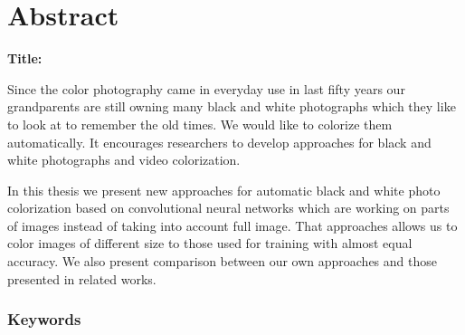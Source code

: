 \chapter*{Abstract}

\noindent\textbf{Title:} \ttitleEn
\bigskip

Since the color photography came in everyday use in last fifty years our grandparents are still owning many black and white photographs which they like to look at to remember the old times. We would like to colorize them automatically. It encourages researchers to develop approaches for black and white photographs and video colorization.

In this thesis we present new approaches for automatic black and white photo colorization based on convolutional neural networks which are working on parts of images instead of taking into account full image. That approaches allows us to color images of different size to those used for training with almost equal accuracy. We also present comparison between our own approaches and those presented in related works. 


\subsection*{Keywords}
\textit{\tkeywordsEn}
\clearemptydoublepage